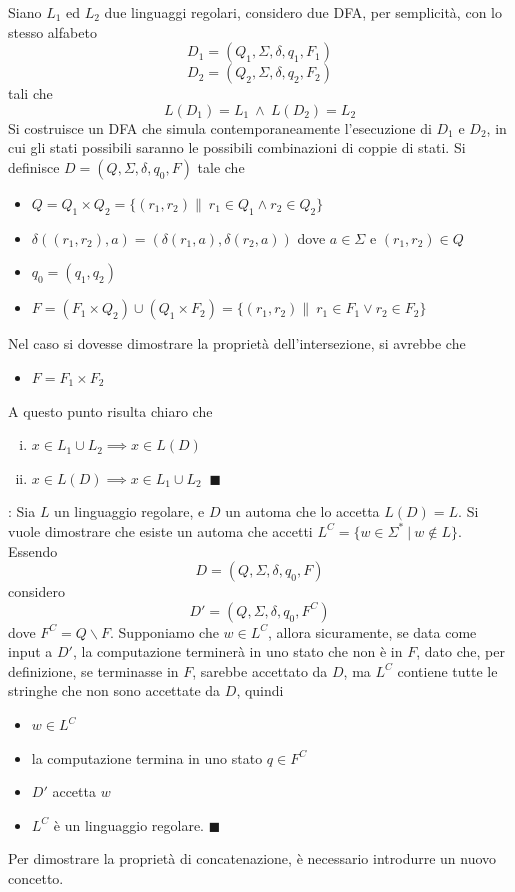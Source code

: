 \documentclass[10pt, letterpaper]{report}
\begin{document}
 Siano $L_1$ ed $L_2$ due linguaggi regolari, considero due DFA, per semplicità, con lo stesso alfabeto
$$ 
D_1 = (Q_1,\Sigma,\delta,q_1,F_1)
$$
$$ 
D_2 = (Q_2,\Sigma,\delta,q_2,F_2)
$$
tali che 
$$ L(D_1)=L_1 \ \land \ L(D_2)=L_2$$
Si costruisce un DFA che simula contemporaneamente l'esecuzione di $D_1$ e $D_2$, in cui gli stati possibili saranno 
le possibili combinazioni di coppie di stati. Si definisce $D=(Q,\Sigma,\delta,q_0,F)$ tale che 
\begin{itemize}
    \item $Q=Q_1\times Q_2=\{(r_1,r_2) \|\ r_1\in Q_1 \land r_2\in Q_2\}$
    \item $\delta((r_1,r_2),a)=(\delta(r_1,a),\delta(r_2,a))$ dove $a\in\Sigma$ e $(r_1,r_2)\in Q$
    \item $q_0=(q_1,q_2)$
    \item $F=(F_1\times Q_2)\cup (Q_1\times F_2)=\{(r_1,r_2)\|\ r_1\in F_1\lor r_2\in F_2\}$
\end{itemize}
Nel caso si dovesse dimostrare la proprietà dell'intersezione, si avrebbe che \begin{itemize}
    \item $F=F_1\times F_2$
\end{itemize}
A questo punto risulta chiaro che 
\begin{enumerate}[(i)] 
    \item $x\in L_1\cup L_2\implies x\in L(D)$
    \item $x\in L(D)\implies x\in L_1\cup L_2\;\;\blacksquare$ 
\end{enumerate}
 : Sia $L$ un linguaggio regolare, e $D$ un automa che lo accetta $L(D)=L$. Si vuole dimostrare 
che esiste un automa che accetti $L^C = \{w\in \Sigma^* \ |\ w\notin L\}$. Essendo 
$$ D=(Q,\Sigma,\delta,q_0,F)$$
considero 
$$ D'=(Q,\Sigma,\delta,q_0,F^C)$$
dove  $F^C=Q\backslash F$. Supponiamo che $w\in L^C$, allora sicuramente, se data come input a $D'$, 
la computazione terminerà in uno stato che non è in $F$, dato che, per definizione, se terminasse in $F$, sarebbe 
accettato da $D$, ma $L^C$ contiene tutte le stringhe che non sono accettate da $D$, quindi\begin{itemize}
    \item $w\in L^C$
    \item  la computazione termina in uno stato $q\in F^C$ 
    \item $D'$ accetta $w$ 
    \item $L^C$ è un linguaggio regolare. $\blacksquare$ 
\end{itemize} 
Per dimostrare la proprietà di concatenazione, è necessario introdurre un nuovo concetto. 
\flowerLine 
\end{document}

